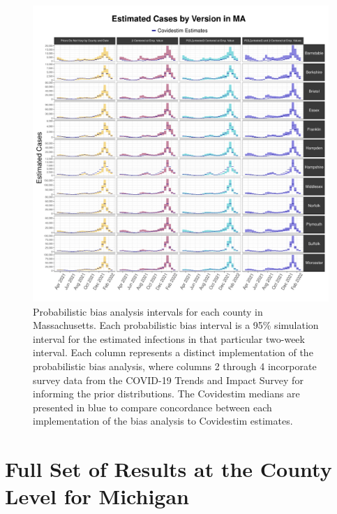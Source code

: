 \documentclass[12pt,twoside]{smiththesis}
\begin{document}
\begin{figure}

{\centering \includegraphics[width=1\linewidth]{figure/ma_pb_compared_to_covidestim} 

}

\caption{\label{fig:ma-comp-covidestim}Probabilistic bias analysis intervals for each county in Massachusetts. Each probabilistic bias interval is a 95\% simulation interval for the estimated infections in that particular two-week interval. Each column represents a distinct implementation of the probabilistic bias analysis, where columns 2 through 4 incorporate survey data from the COVID-19 Trends and Impact Survey for informing the prior distributions. The Covidestim medians are presented in blue to compare concordance between each implementation of the bias analysis to Covidestim estimates.}\label{fig:unnamed-chunk-111}
\end{figure}
\hypertarget{full-set-of-results-at-the-county-level-for-michigan}{%
\section{Full Set of Results at the County Level for Michigan}\label{full-set-of-results-at-the-county-level-for-michigan}}
\end{document}
